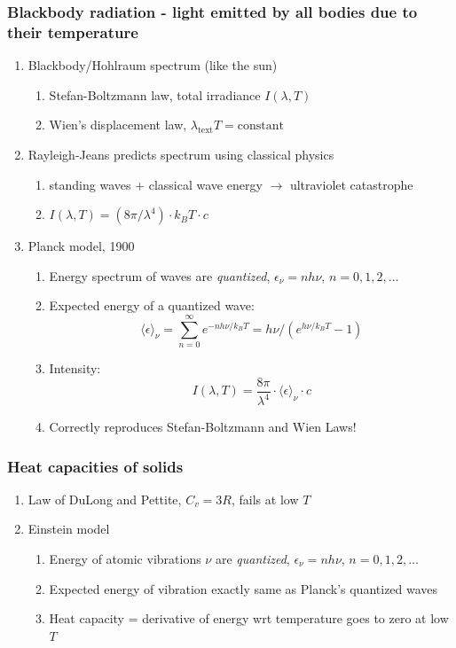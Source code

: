 \documentclass[11pt]{article}
\begin{document}
\subsubsection{Blackbody radiation - light emitted by all bodies due to their temperature}
\label{sec:org41dbcd2}
\begin{enumerate}
\item Blackbody/Hohlraum spectrum (like the sun)
\begin{enumerate}
\item Stefan-Boltzmann law, total irradiance \(I(\lambda,T)\)
\item Wien's displacement law, \(\lambda_\mathrm{text}T = \mathrm{constant}\)
\end{enumerate}
\item Rayleigh-Jeans predicts spectrum using classical physics
\begin{enumerate}
\item standing waves + classical wave energy \(\rightarrow\) ultraviolet catastrophe
\item \(I(\lambda, T) = (8\pi/\lambda^4) \cdot k_B T \cdot c\)
\end{enumerate}
\item Planck model, 1900
\begin{enumerate}
\item Energy spectrum of waves are \emph{quantized}, \(\epsilon_\nu=nh\nu\), \(n = 0,1,2, \ldots\)
\item Expected energy of a quantized wave: 
\[\langle \epsilon \rangle_\nu = \sum_{n=0}^\infty e^{-nh\nu/k_BT} = h\nu/\left (
          e^{h\nu/k_BT}-1 \right )\]
\item Intensity:
\[I(\lambda, T) = \frac{8\pi}{\lambda^4} \cdot \langle\epsilon \rangle_\nu \cdot c \]
\item Correctly reproduces Stefan-Boltzmann and Wien Laws!
\end{enumerate}
\end{enumerate}
\subsubsection{Heat capacities of solids}
\label{sec:org2e890c9}
\begin{enumerate}
\item Law of DuLong and Pettite, \(C_v = 3R\), fails at low \(T\)
\item Einstein model
\begin{enumerate}
\item Energy of atomic vibrations \(\nu\) are \emph{quantized}, \(\epsilon_\nu=nh\nu\), \(n = 0,1,2, \ldots\)
\item Expected energy of vibration exactly same as Planck's quantized waves
\item Heat capacity = derivative of energy wrt temperature goes to zero at low \(T\)
\end{enumerate}
\end{enumerate}
\end{document}
